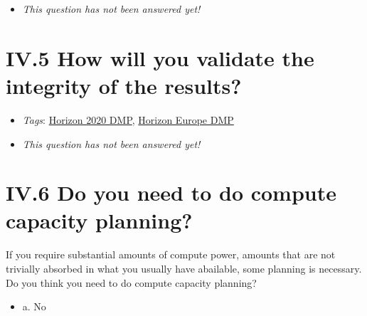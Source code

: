 \documentclass[a4paper,12pt]{report}
\begin{document}
\begin{itemize}
  \item[\XSolidBrush] \textit{This question has not been answered yet!}
\end{itemize}
  


\section*{\protect\textcolor{colorSecId}{IV.5} How will you validate the integrity of the results?}

\label{10a10ffd-bfe1-4c6b-bbb6-3dfb1e63a5d5.918d5fd1-ea37-468f-8acd-ca3e80203900}


\begin{itemize}
  \item \textit{Tags}: \ul{Horizon 2020 DMP}, \ul{Horizon Europe DMP}
  \end{itemize}




\begin{itemize}
  \item[\XSolidBrush] \textit{This question has not been answered yet!}
\end{itemize}
  


\section*{\protect\textcolor{colorSecId}{IV.6} Do you need to do compute capacity planning?}

\label{10a10ffd-bfe1-4c6b-bbb6-3dfb1e63a5d5.e87ef779-2c4b-4c0d-a1f1-821290123a3c}




\noindent
\begin{markdown}
If you require substantial amounts of compute power, amounts that are not trivially absorbed in what you usually have abailable, some planning is necessary. Do you think you need to do compute capacity planning?
\end{markdown}



\begin{itemize}
  \item[\CheckmarkBold] a. No
\end{itemize}
\end{document}

